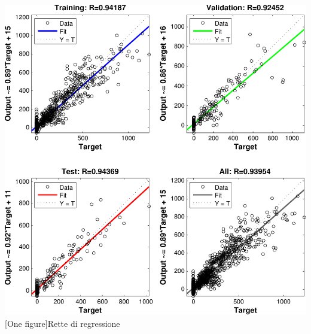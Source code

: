 \includegraphics[scale=0.7]{images/neural_net/regressions.pdf}
[One figure]{Rette di regressione}
\vspace{20px}

\clearpage
